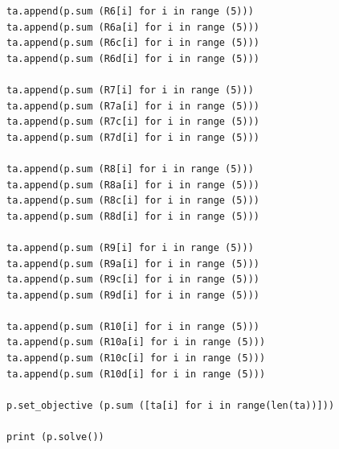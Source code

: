 \begin{lstlisting}[caption={ITUbee SageMath Related Key Differential Cryptanalysis MILP model }, label={lst:milp-Rkey}]
ta.append(p.sum (R6[i] for i in range (5))) 
ta.append(p.sum (R6a[i] for i in range (5)))
ta.append(p.sum (R6c[i] for i in range (5)))
ta.append(p.sum (R6d[i] for i in range (5)))

ta.append(p.sum (R7[i] for i in range (5))) 
ta.append(p.sum (R7a[i] for i in range (5)))
ta.append(p.sum (R7c[i] for i in range (5)))
ta.append(p.sum (R7d[i] for i in range (5)))

ta.append(p.sum (R8[i] for i in range (5))) 
ta.append(p.sum (R8a[i] for i in range (5)))
ta.append(p.sum (R8c[i] for i in range (5)))
ta.append(p.sum (R8d[i] for i in range (5)))

ta.append(p.sum (R9[i] for i in range (5))) 
ta.append(p.sum (R9a[i] for i in range (5)))
ta.append(p.sum (R9c[i] for i in range (5)))
ta.append(p.sum (R9d[i] for i in range (5)))

ta.append(p.sum (R10[i] for i in range (5))) 
ta.append(p.sum (R10a[i] for i in range (5)))
ta.append(p.sum (R10c[i] for i in range (5)))
ta.append(p.sum (R10d[i] for i in range (5)))

p.set_objective (p.sum ([ta[i] for i in range(len(ta))]))

print (p.solve())

\end{lstlisting}

\newpage







